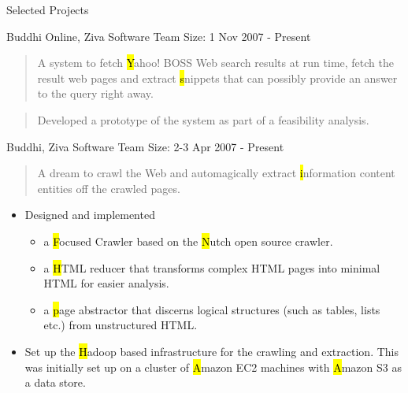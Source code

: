 \documentclass{resume}
\newcommand{\teamsize}{\hfill\sc\footnotesize Team Size: }
\begin{document}
\begin{category}{Selected Projects}{}

    \item {\topic Buddhi Online,} Ziva Software
        {\teamsize 1}
        {\period Nov 2007 - Present}
        \begin{quote}
            A system to fetch {\hl Yahoo! BOSS} Web search results at run time,
            fetch the result web pages and extract {\hl snippets} that can possibly
            provide an answer to the query right away.
        \end{quote}
        \begin{quote}
            Developed a prototype of the system as part of a feasibility analysis.
        \end{quote}

    \item {\topic Buddhi,} Ziva Software
        {\teamsize 2-3}
        {\period Apr 2007 - Present}
        \begin{quote}
            A dream to crawl the Web and automagically extract {\hl information
            content entities} off the crawled pages.
        \end{quote}

            \begin{itemize}
                \item Designed and implemented
                    \begin{itemize}
                        \item a {\hl Focused Crawler} based on the {\hl Nutch} open
                            source crawler.
                        \item a {\hl HTML reducer} that transforms complex HTML
                            pages into minimal HTML for easier analysis.
                        \item a {\hl page abstractor} that discerns logical
                            structures (such as tables, lists etc.) from
                            unstructured HTML.
                    \end{itemize}
                \item Set up the {\hl Hadoop} based infrastructure for the crawling
                    and extraction.  This was initially set up on a cluster of {\hl
                    Amazon EC2} machines with {\hl Amazon S3} as a data store.
            \end{itemize}


\end{category}
\end{document}

